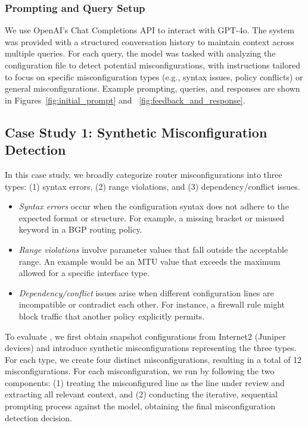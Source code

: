 \subsubsection{Prompting and Query Setup}
We use OpenAI’s Chat Completions API to interact with GPT-4o. The system was provided with a structured conversation history to maintain context across multiple queries. For each query, the model was tasked with analyzing the configuration file to detect potential misconfigurations, with instructions tailored to focus on specific misconfiguration types (e.g., syntax issues, policy conflicts) or general misconfigurations. Example prompting, queries, and responses are shown in Figures~\ref{fig:initial_prompt} and ~\ref{fig:feedback_and_response}.

\subsection{Case Study 1: Synthetic Misconfiguration Detection}
In this case study, we broadly categorize router misconfigurations into three types: (1) syntax errors, (2) range violations, and (3) dependency/conflict issues.
\begin{itemize}
    \item \textit{Syntax errors} occur when the configuration syntax does not adhere to the expected format or structure. For example, a missing bracket or misused keyword in a BGP routing policy.
    \item \textit{Range violations} involve parameter values that fall outside the acceptable range. An example would be an MTU value that exceeds the maximum allowed for a specific interface type.
    \item \textit{Dependency/conflict} issues arise when different configuration lines are incompatible or contradict each other. For instance, a firewall rule might block traffic that another policy explicitly permits.
\end{itemize}

To evaluate \sysname{}, we first obtain snapshot configurations from Internet2 (Juniper devices) and introduce synthetic misconfigurations representing the three types. For each type, we create four distinct misconfigurations, resulting in a total of 12 misconfigurations. For each misconfiguration, we run \sysname{} by following the two components: (1) treating the misconfigured line as the line under review and extracting all relevant context, and (2) conducting the iterative, sequential prompting process against the model, obtaining the final misconfiguration detection decision.

